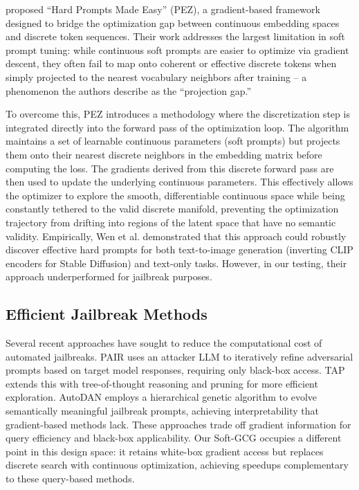 \documentclass[letterpaper]{article} %
\begin{document}
\cite{wen2023hardpromptseasygradientbased} proposed ``Hard Prompts Made Easy'' (PEZ), a gradient-based framework designed to bridge the optimization gap between continuous embedding spaces and discrete token sequences. Their work addresses the largest limitation in soft prompt tuning: while continuous soft prompts are easier to optimize via gradient descent, they often fail to map onto coherent or effective discrete tokens when simply projected to the nearest vocabulary neighbors after training -- a phenomenon the authors describe as the ``projection gap.'' 

To overcome this, PEZ introduces a methodology where the discretization step is integrated directly into the forward pass of the optimization loop. The algorithm maintains a set of learnable continuous parameters (soft prompts) but projects them onto their nearest discrete neighbors in the embedding matrix before computing the loss. The gradients derived from this discrete forward pass are then used to update the underlying continuous parameters. This effectively allows the optimizer to explore the smooth, differentiable continuous space while being constantly tethered to the valid discrete manifold, preventing the optimization trajectory from drifting into regions of the latent space that have no semantic validity. Empirically, Wen et al. demonstrated that this approach could robustly discover effective hard prompts for both text-to-image generation (inverting CLIP encoders for Stable Diffusion) and text-only  tasks. However, in our testing, their approach underperformed for jailbreak purposes. 

\subsection{Efficient Jailbreak Methods}

Several recent approaches have sought to reduce the computational cost of automated jailbreaks. PAIR \citep{chao2023jailbreaking} uses an attacker LLM to iteratively refine adversarial prompts based on target model responses, requiring only black-box access. TAP \citep{mehrotra2023tree} extends this with tree-of-thought reasoning and pruning for more efficient exploration. AutoDAN \citep{liu2024autodan} employs a hierarchical genetic algorithm to evolve semantically meaningful jailbreak prompts, achieving interpretability that gradient-based methods lack. These approaches trade off gradient information for query efficiency and black-box applicability. Our Soft-GCG occupies a different point in this design space: it retains white-box gradient access but replaces discrete search with continuous optimization, achieving speedups complementary to these query-based methods.
\end{document}
